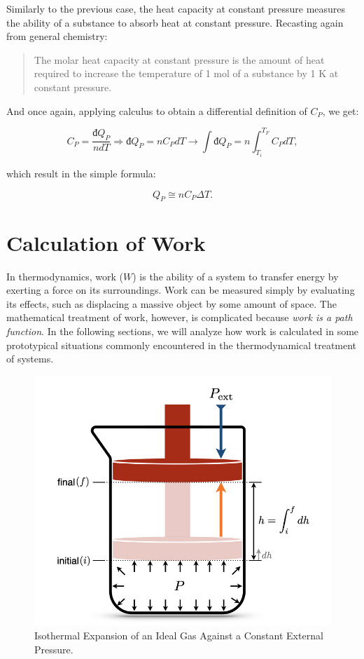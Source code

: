 \documentclass[
  9pt,
]{extbook}
\theoremstyle{definition}
\theoremstyle{definition}
\theoremstyle{definition}
\theoremstyle{remark}
\begin{document}
Similarly to the previous case, the heat capacity at constant pressure measures the ability of a substance to absorb heat at constant pressure. Recasting again from general chemistry:

\begin{quote}
The molar heat capacity at constant pressure is the amount of heat required to increase the temperature of 1 mol of a substance by 1 K at constant pressure.
\end{quote}

And once again, applying calculus to obtain a differential definition of \(C_P\), we get:

\begin{equation}
  C_P = \frac{đ Q_P}{n dT} \Rightarrow đ Q_P = n C_P dT \rightarrow \int đ Q_P = n \int_{T_i}^{T_F}C_P dT,
  \label{eq:Cpdef}
\end{equation}

which result in the simple formula:

\begin{equation}
  Q_P \cong n C_P \Delta T.
  \label{eq:Cpint}
\end{equation}

\hypertarget{workint}{%
\section{Calculation of Work}\label{workint}}

In thermodynamics, work (\(W\)) is the ability of a system to transfer energy by exerting a force on its surroundings. Work can be measured simply by evaluating its effects, such as displacing a massive object by some amount of space. The mathematical treatment of work, however, is complicated because \emph{work is a path function}. In the following sections, we will analyze how work is calculated in some prototypical situations commonly encountered in the thermodynamical treatment of systems.

\begin{figure}

{\centering \includegraphics[width=0.5\linewidth]{./img/OEP_Figures.004} 

}

\caption{Isothermal Expansion of an Ideal Gas Against a Constant External Pressure.}\label{fig:Fig2c3}
\end{figure}
\end{document}
